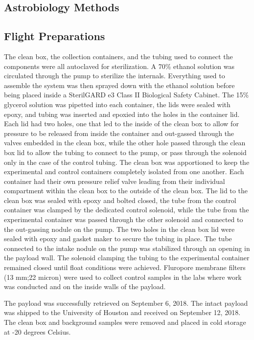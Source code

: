 \subsection{Astrobiology Methods}
\label{sec:Astrobiology Methods}
\subsection{ Flight Preparations }
 The clean box, the collection containers, and the tubing used to connect the components were all autoclaved for sterilization. A 70\% ethanol solution was circulated through the pump to sterilize the internals. Everything used to assemble the system was then sprayed down with the ethanol solution before being placed inside a SterilGARD e3 Class II Biological Safety Cabinet. The 15\% glycerol solution was pipetted into each container, the lids were sealed with epoxy, and tubing was inserted and epoxied into the holes in the container lid. Each lid had two holes, one that led to the inside of the clean box to allow for pressure to be released from inside the container and out-gassed through the valves embedded in the clean box, while the other hole passed through the clean box lid to allow the tubing to connect to the pump, or pass through the solenoid only in the case of the control tubing. The clean box was apportioned to keep the experimental and control containers completely isolated from one another. Each container had their own pressure relief valve leading from their individual compartment within the clean box to the outside of the clean box. The lid to the clean box was sealed with epoxy and bolted closed, the tube from the control container was clamped by the dedicated control solenoid, while the tube from the experimental container was passed through the other solenoid and connected to the out-gassing nodule on the pump. The two holes in the clean box lid were sealed with epoxy and gasket maker to secure the tubing in place. The tube connected to the intake nodule on the pump was stabilized through an opening in the payload wall. The solenoid clamping the tubing to the experimental container remained closed until float conditions were achieved. Fluropore membrane filters (13 mm;22 micron) were used to collect control samples in the labs where work was conducted and on the inside walls of the payload. 
 
 The payload was successfully retrieved on September 6, 2018. The intact payload was shipped to the University of Houston and received on September 12, 2018. The clean box and background samples were removed and placed in cold storage at -20 degrees Celsius.

